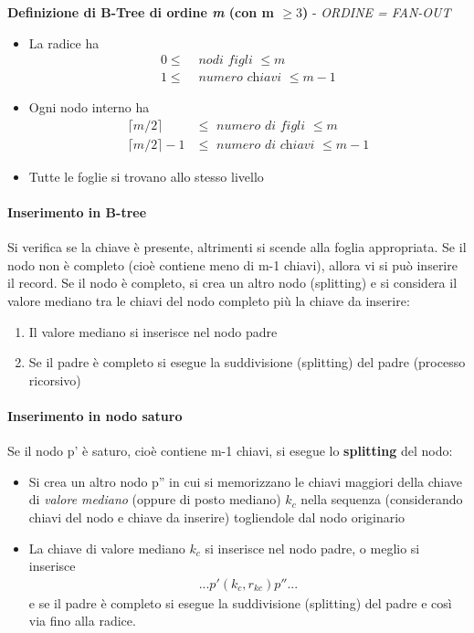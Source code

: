 \documentclass{article}
\begin{document}
		\vspace{1em}
		\textbf{Definizione di B-Tree di ordine \textit{m} (con m $\geq 3$)} - \textit{ORDINE =  FAN-OUT}\begin{itemize}
			\item La radice ha \begin{align*}
				0 \leq &\textit{ nodi figli } \leq m \\
				1 \leq &\textit{ numero chiavi } \leq m-1
			\end{align*}
			\item Ogni nodo interno ha \begin{align*}
				\lceil m/2 \rceil &\leq \textit{ numero di figli } \leq m \\
				\lceil m/2 \rceil -1 &\leq \textit{ numero di chiavi } \leq m-1
			\end{align*}
			\item Tutte le foglie si trovano allo stesso livello
		\end{itemize}
			
		\paragraph{Inserimento in B-tree}
		Si verifica se la chiave è presente, altrimenti si scende alla foglia appropriata. Se il nodo non è completo (cioè contiene meno di m-1 chiavi), allora vi si può inserire il record. Se il nodo è completo, si crea un altro nodo (splitting) e si considera il valore mediano tra le chiavi del nodo completo più la chiave da inserire: \begin{enumerate}
			\item Il valore mediano si inserisce nel nodo padre
			\item Se il padre è completo si esegue la suddivisione (splitting) del padre (processo ricorsivo)
		\end{enumerate}
		
		\paragraph{Inserimento in nodo saturo}
		Se il nodo p' è saturo, cioè contiene m-1 chiavi, si esegue lo \textbf{splitting} del nodo:\begin{itemize}
			\item Si crea un altro nodo p'' in cui si memorizzano le chiavi maggiori della chiave di \textit{valore mediano} (oppure di posto mediano) $k_c$ nella sequenza (considerando chiavi del nodo e chiave da inserire) togliendole dal nodo originario
			\item La chiave di valore mediano $k_c$ si inserisce nel nodo padre, o meglio si inserisce \begin{align*}
				... p' (k_c,r_{kc}) p'' ...
			\end{align*}
		e se il padre è completo si esegue la suddivisione (splitting) del padre e così via fino alla radice.
		\end{itemize}
		
\end{document}
